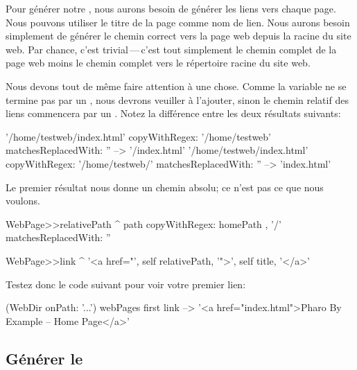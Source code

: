 \documentclass[a4paper,10pt,twoside]{book}
\begin{document}
Pour générer notre \sitemap, nous aurons besoin de générer les liens
vers chaque page.
Nous pouvons utiliser le titre de la page comme nom de lien. Nous
aurons besoin simplement de générer le chemin correct vers la page web
depuis la racine du site web.
Par chance, c'est trivial\,---\,c'est tout simplement le chemin
complet de la page web moins le chemin complet vers le répertoire
racine du site web.

Nous devons tout de même faire attention à une chose. Comme la
variable  ne se termine pas par un \ct{/}, nous devrons
veuiller à l'ajouter, sinon le chemin relatif des liens commencera par
un \ct{/}.
Notez la différence entre les deux résultats suivants:

\begin{code}{}
'/home/testweb/index.html' copyWithRegex: '/home/testweb' matchesReplacedWith: '' --> '/index.html'
'/home/testweb/index.html' copyWithRegex: '/home/testweb/' matchesReplacedWith: '' -->  'index.html'
\end{code}

Le premier résultat nous donne un chemin absolu; ce n'est pas ce que
nous voulons.


\begin{code}{}
WebPage>>relativePath
	^ path 
		copyWithRegex: homePath , '/'
		matchesReplacedWith: ''

WebPage>>link
	^ '<a href="', self relativePath, '">', self title, '</a>'
\end{code}

Testez donc le code suivant pour voir votre premier lien:

\begin{code}{}
(WebDir onPath: '...') webPages first link --> '<a href="index.html">Pharo By Example -- Home Page</a>'
\end{code}

\subsection{Générer le \sitemap}
\end{document}
